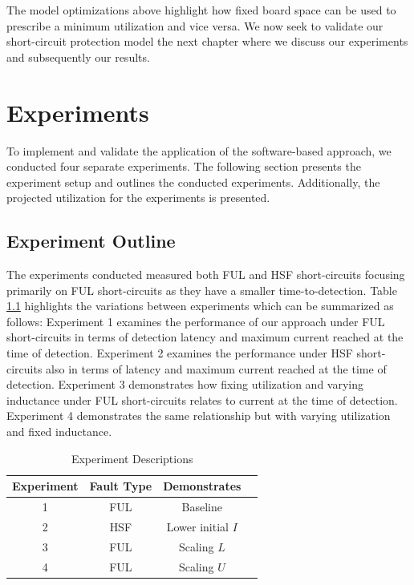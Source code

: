 \documentclass[11pt,oneside]{report}
\begin{document}
    The model optimizations above highlight how fixed board space can be used to prescribe a minimum utilization and vice versa. We now seek to validate our short-circuit protection model the next chapter where we discuss our experiments and subsequently our results.
    
    \chapter{Experiments}\label{chap:experiments}
    To implement and validate the application of the software-based approach, we conducted four separate experiments. The following section presents the experiment setup and outlines the conducted experiments. Additionally, the projected utilization for the experiments is presented.
    
    \section{Experiment Outline}
    The experiments conducted measured both FUL and HSF short-circuits focusing primarily on FUL short-circuits as they have a smaller time-to-detection.
    Table \ref{tab:ExperimentDescriptions} highlights the variations between experiments which can be summarized as follows:
    Experiment 1 examines the performance of our approach under FUL short-circuits in terms of detection latency and maximum current reached at the time of detection. Experiment 2 examines the performance under HSF short-circuits also in terms of latency and maximum current reached at the time of detection.
    Experiment 3 demonstrates how fixing utilization and varying inductance under FUL short-circuits relates to current at the time of detection.
    Experiment 4 demonstrates the same relationship but with varying utilization and fixed inductance.
    \begin{table}[!h]
        \centering	
        \bgroup
        \def\arraystretch{1.00}%
        \begin{tabular}{| c | c | c | c |}
              \hline			
              Experiment & Fault Type & Demonstrates\\ \hline \hline \cline{1-3}
              1 & FUL & Baseline\\ \hline
              2 & HSF & Lower initial $I$\\ \hline
              3 & FUL & Scaling $L$\\ \hline
              4 & FUL & Scaling $U$\\ \hline  
        \end{tabular}
        \egroup
        \caption{Experiment Descriptions}
        \label{tab:ExperimentDescriptions}
    \end{table}
\end{document}
